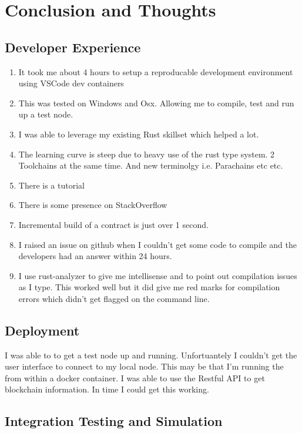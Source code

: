 \chapter{Conclusion and Thoughts}

\section{Developer Experience}

\begin{enumerate}
    \item It took me about 4 hours to setup a reproducable development environment using 
        VSCode dev containers \cite{containers}
    \item This was tested on Windows and Osx. Allowing me to compile, test and 
        run up a test node. 
    \item I was able to leverage my existing Rust skillset which helped a lot.
    \item The learning curve is steep due to heavy use of the rust type system. 2 Toolchains
        at the same time. And new terminolgy i.e. Parachains etc etc.
    \item There is a tutorial \cite{tutorial}
    \item There is some presence on StackOverflow \cite{overflow}
    \item Incremental build of a contract is just over 1 second.
    \item I raised an issue on github when I couldn't get some code to compile and
     the developers had an answer within 24 hours.
    \item I use rust-analyzer to give me intellisense and to point out compilation issues as
        I type. This worked well but it did give me red marks for compilation errors
        which didn't get flagged on the command line.
\end{enumerate}

\section{Deployment}

I was able to to get a test node up and running. Unfortuantely I couldn't get the 
user interface to connect to my local node. This may be that I'm running the 
from within a docker container.
I was able to use the Restful API to get blockchain information. In time I could get
this working.

\section{Integration Testing and Simulation}



